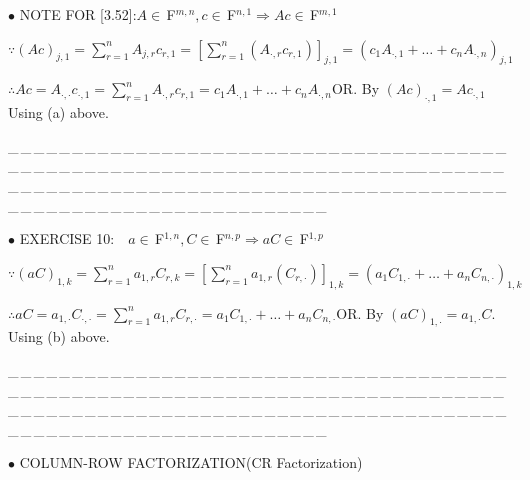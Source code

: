 \documentclass[a4paper, 11pt, UTF8]{article}
\def\Fbfc{$\,{\timesbf F}$}
\begin{document}
\begin{large}
{\small $\bullet$} {\timesbf\Large N{\normalsize OTE} F{\normalsize OR} [3.52]:}\quad $A\in\Fbfc^{m,n},c\in\Fbfc^{n,1}\Rightarrow Ac\in\Fbfc^{m,1}$\par\quad
$\because(Ac)_{j,1}=\sum\limits_{r=1}^n A_{j,r}c_{r,1}=[\sum\limits_{r=1}^n(A_{\cdot,r}c_{r,1})]_{j,1}=(c_1 A_{\cdot,1}+\dots+c_n A_{\cdot,n})_{j,1}$\par\quad
$\therefore Ac=A_{\cdot,\cdot}c_{\cdot,1}=\sum\limits_{r=1}^n A_{\cdot,r}c_{r,1}=c_1 A_{\cdot,1}+\dots+c_n A_{\cdot,n}$\quad O{\small R}. By $(Ac)_{\cdot,1}=Ac_{\cdot,1}$ Using (a) above.\par
{\tiny \_\,\_\,\_\,\_\,\_\,\_\,\_\,\_\,\_\,\_\,\_\,\_\,\_\,\_\,\_\,\_\,\_\,\_\,\_\,\_\,\_\,\_\,\_\,\_\,\_\,\_\,\_\,\_\,\_\,\_\,\_\,\_\,\_\,\_\,\_\,\_\,\_\,\_\,\_\,\_\,\_\,\_\,\_\,\_\,\_\,\_\,\_\,\_\,\_\,\_\,\_\,\_\,\_\,\_\,\_\,\_\,\_\,\_\,\_\,\_\,\_\,\_\,\_\,\_\,\_\,\_\,\_\,\_\,\_\,\_\,\_\_\,\_\,\_\,\_\,\_\,\_\,\_\,\_\,\_\,\_\,\_\,\_\,\_\,\_\,\_\,\_\,\_\,\_\,\_\,\_\,\_\,\_\,\_\,\_\,\_\,\_\,\_\,\_\,\_\,\_\,\_\,\_\,\_\,\_\,\_\,\_\,\_\,\_\,\_\,\_\,\_\,\_\,\_\,\_\,\_\,\_\,\_\,\_\,\_\,\_\,\_\,\_\,\_\,\_\,\_\,\_\,\_\,\_\,\_\,\_\,\_\,\_\,\_\,\_\,\_\,\_\,\_\,\_\,\_\,\_\,\_}\par
{\small $\bullet$} {\timesbf\Large E{\normalsize XERCISE} 10:}\qquad\,\,\,\, $a\in\Fbfc^{1,n},C\in\Fbfc^{n,p}\Rightarrow aC\in\Fbfc^{1,p}$\par\quad
$\because(aC)_{1,k}=\sum\limits_{r=1}^n a_{1,r}C_{r,k}=[\sum\limits_{r=1}^n a_{1,r}(C_{r,\cdot})]_{1,k}=(a_1 C_{1,\cdot}+\dots+a_n C_{n,\cdot})_{1,k}$\par\quad
$\therefore aC=a_{1,\cdot}C_{\cdot,\cdot}=\sum\limits_{r=1}^n a_{1,r}C_{r,\cdot}=a_1 C_{1,\cdot}+\dots+a_n C_{n,\cdot}$\quad O{\small R}. By $(aC)_{1,\cdot}=a_{1,\cdot}C$. Using (b) above.
\par
{\tiny \_\,\_\,\_\,\_\,\_\,\_\,\_\,\_\,\_\,\_\,\_\,\_\,\_\,\_\,\_\,\_\,\_\,\_\,\_\,\_\,\_\,\_\,\_\,\_\,\_\,\_\,\_\,\_\,\_\,\_\,\_\,\_\,\_\,\_\,\_\,\_\,\_\,\_\,\_\,\_\,\_\,\_\,\_\,\_\,\_\,\_\,\_\,\_\,\_\,\_\,\_\,\_\,\_\,\_\,\_\,\_\,\_\,\_\,\_\,\_\,\_\,\_\,\_\,\_\,\_\,\_\,\_\,\_\,\_\,\_\,\_\_\,\_\,\_\,\_\,\_\,\_\,\_\,\_\,\_\,\_\,\_\,\_\,\_\,\_\,\_\,\_\,\_\,\_\,\_\,\_\,\_\,\_\,\_\,\_\,\_\,\_\,\_\,\_\,\_\,\_\,\_\,\_\,\_\,\_\,\_\,\_\,\_\,\_\,\_\,\_\,\_\,\_\,\_\,\_\,\_\,\_\,\_\,\_\,\_\,\_\,\_\,\_\,\_\,\_\,\_\,\_\,\_\,\_\,\_\,\_\,\_\,\_\,\_\,\_\,\_\,\_\,\_\,\_\,\_\,\_\,\_}\par
{\small $\bullet$} {\Large C{\normalsize OLUMN}-R{\normalsize OW} F{\normalsize ACTORIZATION}}\qquad (CR Factorization)\par\,\,

\end{large}
\end{document}
